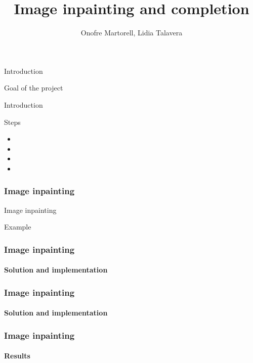 \documentclass[11pt]{beamer}
\author{Onofre Martorell, Lidia Talavera}
\title{Image inpainting and completion}
\begin{document}
\begin{frame}
\titlepage
\end{frame}


\begin{frame}{Introduction}
\begin{block}{Goal of the project}

\end{block}

\end{frame}

\begin{frame}{Introduction}
\begin{block}{Steps}
\begin{itemize}
\item
\item
\item
\item
\end{itemize}
\end{block}

\end{frame}

\begin{frame}
\frametitle{Image inpainting}

\begin{block}{Image inpainting}

\end{block}

\begin{exampleblock}{Example}
\end{exampleblock}
\end{frame}

\begin{frame}
\frametitle{Image inpainting}
\framesubtitle{Solution and implementation}

\end{frame}

\begin{frame}
\frametitle{Image inpainting}
\framesubtitle{Solution and implementation}

\end{frame}

\begin{frame}
\frametitle{Image inpainting}
\framesubtitle{Results}

\end{frame}
\end{document}
